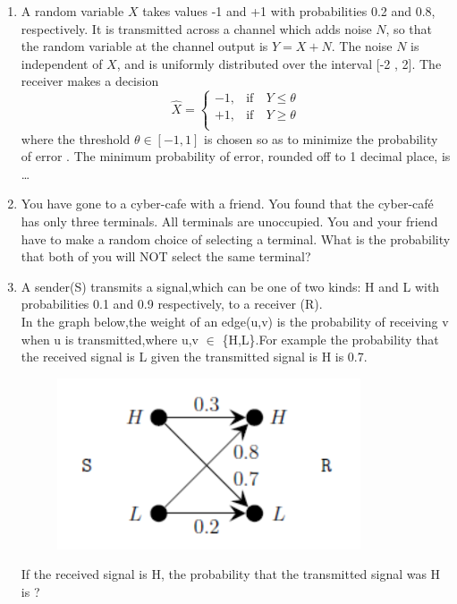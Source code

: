 \documentclass[journal,12pt,twocolumn]{IEEEtran}
\begin{document}
\begin{enumerate}
\item A random variable $X$ takes values -1 and +1 with probabilities 0.2 and 0.8, respectively.
It is transmitted across a channel which adds noise $N$, so that the random variable at the
channel output is $Y = X + N$. The noise $N$ is independent of $X$, and is uniformly
distributed over the interval [-2 , 2]. The receiver makes a decision
\[
\hat{X} = \begin{cases}
            -1, &\text{if}\quad Y \leq \theta \\
             +1, &\text{if}\quad Y \geq \theta\\
            \end{cases}
\]
where the threshold $\theta  \in [-1,1]$ is chosen so as to minimize the probability of error
. The minimum probability of error, rounded off to 1 decimal place, is \dots
\\
\solution

\item You have gone to a cyber-cafe with a friend. You found that the cyber-café has only three terminals. All terminals are unoccupied. You and your friend have to make a random choice of selecting a terminal. What is the probability that both of you will NOT select the same terminal?
%
\\
\solution



\item A sender(S) transmits a signal,which can be one of two kinds: H and L with probabilities 0.1 and 0.9 respectively, to a receiver (R).\\
In the graph below,the weight of an edge(u,v) is the probability of receiving v when u is transmitted,where u,v $\in$ \{H,L\}.For example the probability that the received signal is L given the transmitted signal is H is 0.7.
\begin{figure}[h!]
    \centering
    \includegraphics[width=\columnwidth]{solutions/cs/2021/figures/qnfigure.png}
\end{figure}
%
If the received signal is H, the probability that the transmitted signal was H is \underline{\quad\quad\quad} ?


\end{enumerate}
\end{document}
